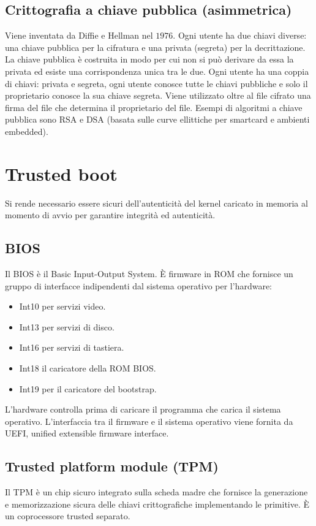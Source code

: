 \subsection{Crittografia a chiave pubblica (asimmetrica)}
Viene inventata da Diffie e Hellman nel $1976$. Ogni utente ha due chiavi diverse: una chiave pubblica per la cifratura e una privata (segreta) per la decrittazione. La chiave pubblica
\`e costruita in modo per cui non si pu\`o derivare da essa la privata ed esiste una corrispondenza unica tra le due. Ogni utente ha una coppia di chiavi: privata e segreta, ogni utente
conosce tutte le chiavi pubbliche e solo il proprietario conosce la sua chiave segreta. Viene utilizzato oltre al file cifrato una firma del file che determina il proprietario del file. 
Esempi di algoritmi a chiave pubblica sono RSA e DSA (basata sulle curve ellittiche per smartcard e ambienti embedded). 
\section{Trusted boot}
Si rende necessario essere sicuri dell'autenticit\`a del kernel caricato in memoria al momento di avvio per garantire integrit\`a ed autenticit\`a. 
\subsection{BIOS}
Il BIOS \`e il Basic Input-Output System. \`E firmware in ROM che fornisce un gruppo di interfacce indipendenti dal sistema operativo per l'hardware:
\begin{itemize}
	\item Int10 per servizi video.
	\item Int13 per servizi di disco.
	\item Int16 per servizi di tastiera.
	\item Int18 il caricatore della ROM BIOS.
	\item Int19 per il caricatore del bootstrap. 
\end{itemize}
L'hardware controlla prima di caricare il programma che carica il sistema operativo. L'interfaccia tra il firmware e il sistema operativo viene fornita da UEFI, unified extensible 
firmware interface. 
\subsection{Trusted platform module (TPM)}
Il TPM \`e un chip sicuro integrato sulla scheda madre che fornisce la generazione e memorizzazione sicura delle chiavi crittografiche implementando le primitive. \`E un coprocessore
trusted separato. 
